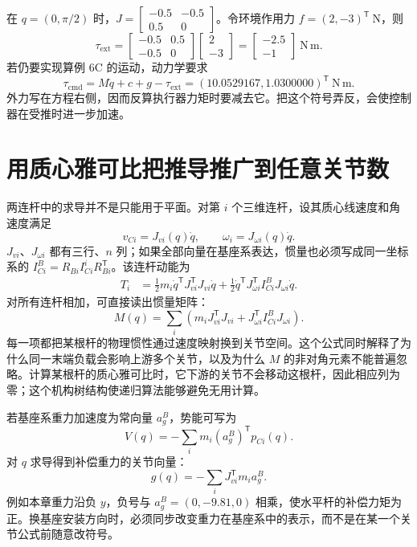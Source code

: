 \begin{examplebox}[算例 6D 人向下拉末端时执行器要多出多少力矩]
在 $q=(0,\pi/2)$ 时，$J=\begin{bmatrix}-0.5&-0.5\\0.5&0\end{bmatrix}$。令环境作用力 $f=(2,-3)^{\mathsf T}\ \mathrm N$，则
\[
 \tau_{\mathrm{ext}}=\begin{bmatrix}-0.5&0.5\\-0.5&0\end{bmatrix}
 \begin{bmatrix}2\\-3\end{bmatrix}=\begin{bmatrix}-2.5\\-1\end{bmatrix}\ \mathrm{N\,m}.
\]
若仍要实现算例 6C 的运动，动力学要求
\[
 \tau_{\mathrm{cmd}}=M\ddot q+c+g-\tau_{\mathrm{ext}}
 =(10.0529167,1.0300000)^{\mathsf T}\ \mathrm{N\,m}.
\]
外力写在方程右侧，因而反算执行器力矩时要减去它。把这个符号弄反，会使控制器在受推时进一步加速。
\end{examplebox}

\section{用质心雅可比把推导推广到任意关节数}
两连杆中的求导并不是只能用于平面。对第 $i$ 个三维连杆，设其质心线速度和角速度满足
\[
 v_{Ci}=J_{vi}(q)\dot q,\qquad\omega_i=J_{\omega i}(q)\dot q.
\]
$J_{vi}$、$J_{\omega i}$ 都有三行、$n$ 列；如果全部向量在基座系表达，惯量也必须写成同一坐标系的 $I_{Ci}^B=R_{Bi}I_{Ci}^iR_{Bi}^{\mathsf T}$。该连杆动能为
\begin{align}
 T_i&=\tfrac12m_i\dot q^{\mathsf T}J_{vi}^{\mathsf T}J_{vi}\dot q
 +\tfrac12\dot q^{\mathsf T}J_{\omega i}^{\mathsf T}I_{Ci}^BJ_{\omega i}\dot q.
\end{align}
对所有连杆相加，可直接读出惯量矩阵：
\begin{equation}
 M(q)=\sum_i\left(m_iJ_{vi}^{\mathsf T}J_{vi}
 +J_{\omega i}^{\mathsf T}I_{Ci}^BJ_{\omega i}\right).
\end{equation}
每一项都把某根杆的物理惯性通过速度映射换到关节空间。这个公式同时解释了为什么同一末端负载会影响上游多个关节，以及为什么 $M$ 的非对角元素不能普遍忽略。计算某根杆的质心雅可比时，它下游的关节不会移动这根杆，因此相应列为零；这个机构树结构使递归算法能够避免无用计算。

若基座系重力加速度为常向量 $a_g^B$，势能可写为
\[
 V(q)=-\sum_i m_i(a_g^B)^{\mathsf T}p_{Ci}(q).
\]
对 $q$ 求导得到补偿重力的关节向量：
\begin{equation}
 g(q)=-\sum_i J_{vi}^{\mathsf T}m_i a_g^B.
\end{equation}
例如本章重力沿负 $y$，负号与 $a_g^B=(0,-9.81,0)$ 相乘，使水平杆的补偿力矩为正。换基座安装方向时，必须同步改变重力在基座系中的表示，而不是在某一个关节公式前随意改符号。

